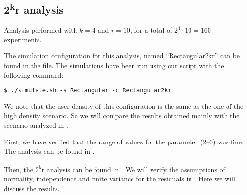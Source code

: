 \subsection{2\texorpdfstring{\textsuperscript{k}}{k}r
analysis}\label{subsec:rect2kr}

Analysis performed with \(k\!=\!4\) and \(r\!=\!10\), for a total of \(2^4 \cdot
10 \!=\!160\) experiments.

The simulation configuration for this analysis, named ``Rectangular2kr'' can be
found in the  file. The simulations have been run using
our  script with the following command:
\begin{verbatim}
$ ./simulate.sh -s Rectangular -c Rectangular2kr
\end{verbatim}

We note that the user density of this configuration is the same as the one of
the high density scenario. So we will compare the results obtained mainly with
the scenario analyzed in .

First, we have verified that the range of values for the 
parameter (2--6) was fine. The analysis can be found in .

Then, the 2\textsuperscript{k}r analysis can be found in . We
will verify the assumptions of normality, independence and finite variance for
the residuals in . Here we will discuss the
results.





